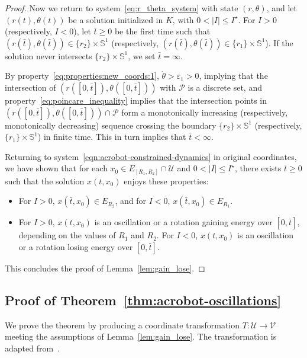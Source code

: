\documentclass[journal,twoside,web, twocolumn,draftcls]{ieeecolor}
\newcommand*{\Sone}{\mathbb{S}^1}
\newcommand*{\cU}{\mathcal{U}}
\newcommand*{\cV}{\mathcal{V}}
\newcommand*{\cP}{\mathcal{P}}
\begin{document}
\begin{proof}
Now we return to system~\eqref{eq:r_theta_system} with state $(r,\theta)$, and let $(r(t),\theta(t))$ be a solution initialized in $K$, with $0< |I| \leq I^\star$. 
For $I>0$ (respectively, $I<0$), let $\bar t \geq 0$ be the first time such that $( r(\bar t), \theta(\bar t)) \in \{r_2\} \times \Sone$ (respectively, $( r(\bar t), \theta(\bar t)) \in \{r_1\} \times \Sone$). If the solution never intersects $\{r_2\} \times \Sone$, we set $\bar t = \infty$.

By property~\eqref{eq:properties:new_coords:1}, $\dot \theta > \varepsilon_1>0$, implying that the intersection of $( r([0,\bar t]),\theta([0,\bar t]) )$ with $\cP$ is a discrete set, and property~\eqref{eq:poincare_inequality} implies that the intersection points in $( r([0,\bar t]),\theta([0,\bar t]) ) \cap \cP$ form a monotonically increasing (respectively, monotonically decreasing) sequence crossing the boundary $\{r_2\} \times \Sone$ (respectively, $\{r_1\} \times \Sone$) in finite time. This in turn implies that $\bar t< \infty$. 

Returning to system~\eqref{eqn:acrobot-constrained-dynamics} in original coordinates, we have shown that for each $x_0 \in E_{[R_1,R_2]}\cap \cU$ and $0< |I| \leq I^\star$, there exists $\bar t\geq 0$ such that the solution $x(t,x_0)$ enjoys these properties:
\begin{itemize}
\item For $I>0$, $x(\bar t,x_0) \in E_{R_2}$, and for $I<0$, $x(\bar t,x_0) \in E_{R_1}$.
\item For $I>0$, $x(t,x_0)$ is an oscillation or a rotation gaining energy over $[0, \bar t]$, depending on the values of $R_1$ and $R_2$. For $I<0$, $x(t,x_0)$ is an oscillation or a rotation losing energy over $[0, \bar t]$.
\end{itemize}
This concludes the proof of Lemma~\ref{lem:gain_lose}.
\end{proof}



\subsection{Proof of Theorem~\ref{thm:acrobot-oscillations}}

We prove the theorem by producing a coordinate transformation $T : \cU \to \cV$ meeting the assumptions of Lemma~\ref{lem:gain_lose}. The transformation is adapted from~\cite{dynamic_vhcs_stabilize_closed_orbits}.
  
\end{document}
